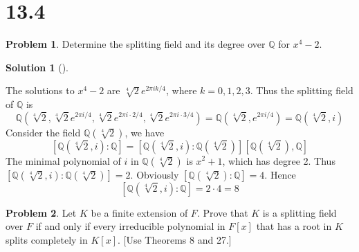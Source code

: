 \documentclass{article}
\theoremstyle{definition}
\newtheorem{prob}{Problem}
\newtheorem*{sol}{Solution}
\newenvironment{sols}[1][]{%
  \begin{sol}[#1]$ $\par\nobreak\ignorespaces
}{%
  \end{sol}
}
\begin{document}
\section*{13.4}

\setcounter{prob}{1}
\begin{prob}
	Determine the splitting field and its degree over $\mathbb{Q}$ for $x^4 - 2$.
\end{prob}

\begin{sols}
	The solutions to $x^4 - 2$ are $\sqrt[4]{2} e^{2 \pi  i k/4}$, where $k = 0, 1, 2, 3$.
	Thus the splitting field of $\mathbb{Q}$ is 
	\[
		\mathbb{Q}(\sqrt[4]{2}, \sqrt[4]{2} e^{2 \pi i /4}, \sqrt[4]{2} e^{2 \pi i \cdot 2/4}, \sqrt[4]{2} e^{2 \pi i \cdot 3/4}) = \mathbb{Q}(\sqrt[4]{2}, e^{2 \pi i/4}) = \mathbb{Q}(\sqrt[4]{2}, i)
	\]
	Consider the field $\mathbb{Q}(\sqrt[4]{2})$, we have
	\[
		[\mathbb{Q}(\sqrt[4]{2}, i):\mathbb{Q}] = [\mathbb{Q}(\sqrt[4]{2}, i):\mathbb{Q}(\sqrt[4]{2})][\mathbb{Q}(\sqrt[4]{2}), \mathbb{Q}]
	\]
	The minimal polynomial of $i$ in $\mathbb{Q}(\sqrt[4]{2})$ is $x^2 + 1$, which has degree 2.
	Thus $[\mathbb{Q}(\sqrt[4]{2}, i) : \mathbb{Q}(\sqrt[4]{2})] = 2$.
	Obviously $[\mathbb{Q}(\sqrt[4]{2}):\mathbb{Q}] = 4$.
	Hence
	\[
		[\mathbb{Q}(\sqrt[4]{2}, i):\mathbb{Q}] = 2 \cdot 4 = 8
	\]
\end{sols}

\setcounter{prob}{4}
\begin{prob}
	Let $K$ be a finite extension of $F$.
	Prove that $K$ is a splitting field over $F$ if and only if every irreducible polynomial in $F[x]$ that has a root in $K$ splits completely in $K[x]$.
	[Use Theorems 8 and 27.]
\end{prob}
\end{document}
